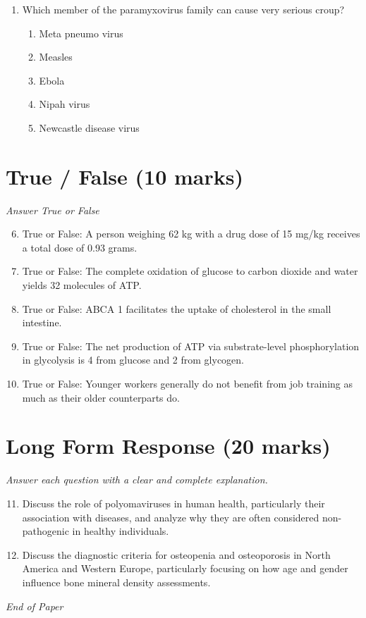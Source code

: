 \documentclass[12pt]{article}
\begin{document}
\begin{enumerate}[label=\arabic*.]
\begin{enumerate}[label=(\alph*)]
    \item Physiological
    \item Behavioral
    \item Biological
    \item Anthropological
    \item Environmental
\end{enumerate}
\item Which member of the paramyxovirus family can cause very serious croup?
\begin{enumerate}[label=(\alph*)]
    \item Meta pneumo virus
    \item Measles
    \item Ebola
    \item Nipah virus
    \item Newcastle disease virus
\end{enumerate}
\end{enumerate}

\section*{True / False (10 marks)}
\textit{Answer True or False}
\begin{enumerate}[label=\arabic*.]
\setcounter{enumi}{5}
\item True or False: A person weighing 62 kg with a drug dose of 15 mg/kg receives a total dose of 0.93 grams.
\item True or False: The complete oxidation of glucose to carbon dioxide and water yields 32 molecules of ATP.
\item True or False: ABCA 1 facilitates the uptake of cholesterol in the small intestine.
\item True or False: The net production of ATP via substrate-level phosphorylation in glycolysis is 4 from glucose and 2 from glycogen.
\item True or False: Younger workers generally do not benefit from job training as much as their older counterparts do.
\end{enumerate}

\section*{Long Form Response (20 marks)}
\textit{Answer each question with a clear and complete explanation.}
\begin{enumerate}[label=\arabic*.]
\setcounter{enumi}{10}
\item Discuss the role of polyomaviruses in human health, particularly their association with diseases, and analyze why they are often considered non-pathogenic in healthy individuals.
\item Discuss the diagnostic criteria for osteopenia and osteoporosis in North America and Western Europe, particularly focusing on how age and gender influence bone mineral density assessments.
\end{enumerate}

\vfill
\noindent\textit{End of Paper}
\end{document}
